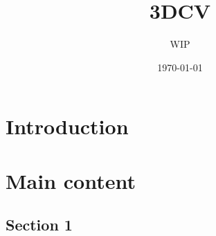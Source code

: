 \documentclass[12pt]{article}
\title{3DCV}
\author{WIP}
\date{\today}
\begin{document}
\maketitle

\section{Introduction}


\section{Main content}


\subsection{Section 1}
\end{document}
